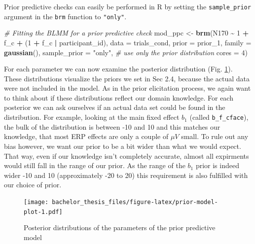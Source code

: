 \documentclass[
  doc,12pt,floatsintext]{apa7}
\newenvironment{Shaded}{\begin{snugshade}}{\end{snugshade}}
\newcommand{\AttributeTok}[1]{\textcolor[rgb]{0.13,0.29,0.53}{#1}}
\newcommand{\CommentTok}[1]{\textcolor[rgb]{0.56,0.35,0.01}{\textit{#1}}}
\newcommand{\DecValTok}[1]{\textcolor[rgb]{0.00,0.00,0.81}{#1}}
\newcommand{\FunctionTok}[1]{\textcolor[rgb]{0.13,0.29,0.53}{\textbf{#1}}}
\newcommand{\NormalTok}[1]{#1}
\newcommand{\OtherTok}[1]{\textcolor[rgb]{0.56,0.35,0.01}{#1}}
\newcommand{\SpecialCharTok}[1]{\textcolor[rgb]{0.81,0.36,0.00}{\textbf{#1}}}
\newcommand{\StringTok}[1]{\textcolor[rgb]{0.31,0.60,0.02}{#1}}
\begin{document}
Prior predictive checks can easily be performed in R by setting the \texttt{sample\_prior} argument in the \texttt{brm} function to \texttt{"only"}.

\begin{Shaded}
\begin{Highlighting}[]
\CommentTok{\# Fitting the BLMM for a prior predictive check}
\NormalTok{mod\_ppc }\OtherTok{\textless{}{-}} \FunctionTok{brm}\NormalTok{(N170 }\SpecialCharTok{\textasciitilde{}} \DecValTok{1} \SpecialCharTok{+}\NormalTok{ f\_c }\SpecialCharTok{+}\NormalTok{ (}\DecValTok{1} \SpecialCharTok{+}\NormalTok{ f\_c }\SpecialCharTok{|}\NormalTok{ participant\_id),}
               \AttributeTok{data =}\NormalTok{ trials\_cond, }
               \AttributeTok{prior =}\NormalTok{ prior\_1,}
               \AttributeTok{family =} \FunctionTok{gaussian}\NormalTok{(),}
               \AttributeTok{sample\_prior =} \StringTok{"only"}\NormalTok{, }\CommentTok{\# use only the prior distribution}
               \AttributeTok{cores =} \DecValTok{4}\NormalTok{) }
\end{Highlighting}
\end{Shaded}

For each parameter we can now examine the posterior distribution (Fig. \ref{fig:prior-model-plot}). These distributions visualize the priors we set in Sec 2.4, because the actual data were not included in the model. As in the prior elicitation process, we again want to think about if these distributions reflect our domain knowledge. For each posterior we can ask ourselves if an actual data set could be found in the distribution. For example, looking at the main fixed effect \(b_1\) (called \texttt{b\_f\_cface}), the bulk of the distribution is between -10 and 10 and this matches our knowledge, that most ERP effects are only a couple of \(\mu V\) small. To rule out any bias however, we want our prior to be a bit wider than what we would expect. That way, even if our knowledge isn't completely accurate, almost all expirments would still fall in the range of our prior. As the range of the \(b_1\) prior is indeed wider -10 and 10 (approximately -20 to 20) this requirement is also fulfilled with our choice of prior.



\begin{figure}
\centering
\texttt{[image: bachelor\_thesis\_files/figure-latex/prior-model-plot-1.pdf]}
\caption{\label{fig:prior-model-plot}Posterior distributions of the parameters of the prior predictive model}
\end{figure}
\end{document}
